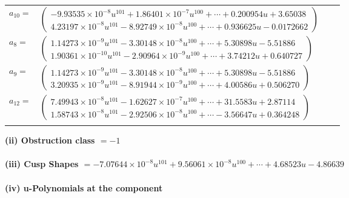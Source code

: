 \documentclass[1p]{elsarticle_modified}
\theoremstyle{definition}
\begin{document}
\begin{tabular}{m{7pt} m{180pt} m{7pt} m{180pt} }
\flushright $a_{10}=$&$\begin{pmatrix}-9.93535\times10^{-8} u^{101}+1.86401\times10^{-7} u^{100}+\cdots+0.200954 u+3.65038\\4.23197\times10^{-8} u^{101}-8.92749\times10^{-8} u^{100}+\cdots+0.936625 u-0.0172662\end{pmatrix}$ \\
\flushright $a_{8}=$&$\begin{pmatrix}1.14273\times10^{-9} u^{101}-3.30148\times10^{-8} u^{100}+\cdots+5.30898 u-5.51886\\1.90361\times10^{-10} u^{101}-2.90964\times10^{-9} u^{100}+\cdots+3.74212 u+0.640727\end{pmatrix}$ \\
\flushright $a_{9}=$&$\begin{pmatrix}1.14273\times10^{-9} u^{101}-3.30148\times10^{-8} u^{100}+\cdots+5.30898 u-5.51886\\3.20935\times10^{-9} u^{101}-8.91944\times10^{-9} u^{100}+\cdots+4.00586 u+0.506270\end{pmatrix}$ \\
\flushright $a_{12}=$&$\begin{pmatrix}7.49943\times10^{-8} u^{101}-1.62627\times10^{-7} u^{100}+\cdots+31.5583 u+2.87114\\1.58743\times10^{-8} u^{101}-2.92506\times10^{-8} u^{100}+\cdots-3.56647 u+0.364248\end{pmatrix}$\\&\end{tabular}
\flushleft \textbf{(ii) Obstruction class $= -1$}\\~\\
\flushleft \textbf{(iii) Cusp Shapes $= -7.07644\times10^{-8} u^{101}+9.56061\times10^{-8} u^{100}+\cdots+4.68523 u-4.86639$}\\~\\
\newpage\renewcommand{\arraystretch}{1}
\flushleft \textbf{(iv) u-Polynomials at the component}\newline \\
\end{document}
